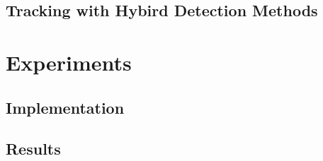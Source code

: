 \documentclass[12pt]{article}
\begin{document}
\subsection{Tracking with Hybird Detection Methods}




\section{Experiments}\label{experiments}
\subsection{Implementation}\label{Implementation} 


\subsection{Results}
 
 



\end{document}
